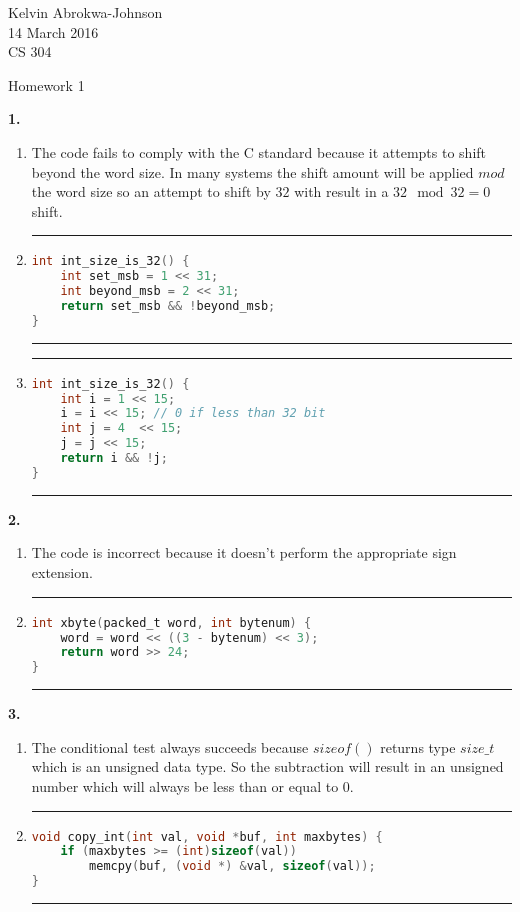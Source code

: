 \documentclass[11pt]{article} %
\newcommand{\hr}{\noindent\rule{14cm}{0.4pt}}
\begin{document}
 

\noindent Kelvin Abrokwa-Johnson \\
14 March 2016 \\
CS 304

\begin{center} Homework 1 \end{center}


{\bf 1.}

\begin{enumerate}[label=\alph*)]

\item
The code fails to comply with the C standard because it attempts to shift beyond the word size. In many systems the shift amount will be applied $mod$ the word size so an attempt to shift by $32$ with result in a $32 \mod 32 = 0$ shift.

\item
\hr
\begin{lstlisting}[language=C]
int int_size_is_32() {
	int set_msb = 1 << 31;
	int beyond_msb = 2 << 31;
	return set_msb && !beyond_msb;
}
\end{lstlisting}
\hr


\item
\hr
\begin{lstlisting}[language=C]
int int_size_is_32() {
	int i = 1 << 15;
	i = i << 15; // 0 if less than 32 bit
	int j = 4  << 15;
	j = j << 15;
	return i && !j;
}
\end{lstlisting}
\hr
\end{enumerate}




\vspace{0.5in}
{\bf 2.}

\begin{enumerate}[label=\alph*)]
\item 
The code is incorrect because it doesn't perform the appropriate sign extension.

\item
\hr
\begin{lstlisting}[language=C]
int xbyte(packed_t word, int bytenum) {
	word = word << ((3 - bytenum) << 3);
	return word >> 24;
}
\end{lstlisting}
\hr
\end{enumerate}

\pagebreak
{\bf 3.}
\begin{enumerate}[label=\alph*)]
\item
The conditional test always succeeds because $sizeof()$ returns type $size\_t$ which is an unsigned data type. So the subtraction will result in an unsigned number which will always be less than or equal to $0$.
\item
\hr
\begin{lstlisting}[language=C]
void copy_int(int val, void *buf, int maxbytes) {
	if (maxbytes >= (int)sizeof(val))
		memcpy(buf, (void *) &val, sizeof(val));
}
\end{lstlisting}
\hr


\end{enumerate}
\end{document}
